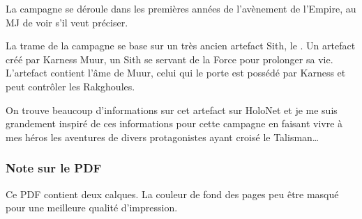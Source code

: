 \documentclass{jdrp}
\begin{document}
	La campagne se déroule dans les premières années de l’avènement de l’Empire, au MJ de voir s’il veut préciser.

	La trame de la campagne se base sur un très ancien artefact Sith, le . Un artefact créé par Karness Muur, un Sith se servant de la Force pour prolonger sa vie. L’artefact contient l’âme de Muur, celui qui le porte est possédé par Karness et peut contrôler les Rakghoules.


	On trouve beaucoup d’informations sur cet artefact sur HoloNet et je me suis grandement inspiré de ces informations pour cette campagne en faisant vivre à mes héros les aventures de divers protagonistes ayant croisé le Talisman\ldots

    \subsubsection{Note sur le PDF}

    Ce PDF contient deux calques. La couleur de fond des pages peu être masqué pour une meilleure qualité d’impression.


	\twocolumn

	
	
	
	
	
	
	

	\onecolumn
	\nocite{*}
	\printbibliography
\end{document}

